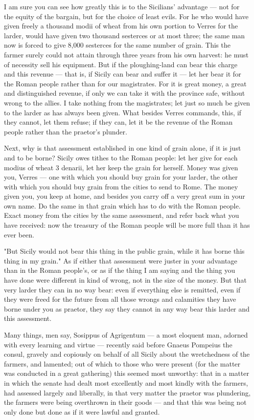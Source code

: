  I am sure you can see how greatly this is to the Sicilians' advantage --- not for the equity of the bargain, but for the choice of least evils. For he who would have given freely a thousand modii of wheat from his own portion to Verres for the larder, would have given two thousand sesterces or at most three; the same man now is forced to give 8,000 sesterces for the same number of grain. This the farmer surely could not attain through three years from his own harvest: he must of necessity sell his equipment. But if the ploughing-land can bear this charge and this revenue --- that is, if Sicily can bear and suffer it --- let her bear it for the Roman people rather than for our magistrates. For it is great money, a great and distinguished revenue, if only we can take it with the province safe, without wrong to the allies. I take nothing from the magistrates; let just so much be given to the larder as has always been given. What besides Verres commands, this, if they cannot, let them refuse; if they can, let it be the revenue of the Roman people rather than the praetor's plunder.

 Next, why is that assessment established in one kind of grain alone, if it is just and to be borne? Sicily owes tithes to the Roman people: let her give for each modius of wheat 3 denarii, let her keep the grain for herself. Money was given you, Verres --- one with which you should buy grain for your larder, the other with which you should buy grain from the cities to send to Rome. The money given you, you keep at home, and besides you carry off a very great sum in your own name. Do the same in that grain which has to do with the Roman people. Exact money from the cities by the same assessment, and refer back what you have received: now the treasury of the Roman people will be more full than it has ever been.

 "But Sicily would not bear this thing in the public grain, while it has borne this thing in my grain." As if either that assessment were juster in your advantage than in the Roman people's, or as if the thing I am saying and the thing you have done were different in kind of wrong, not in the size of the money. But that very larder they can in no way bear: even if everything else is remitted, even if they were freed for the future from all those wrongs and calamities they have borne under you as praetor, they say they cannot in any way bear this larder and this assessment.

 Many things, men say, Sosippus of Agrigentum --- a most eloquent man, adorned with every learning and virtue --- recently said before Gnaeus Pompeius the consul, gravely and copiously on behalf of all Sicily about the wretchedness of the farmers, and lamented; out of which to those who were present (for the matter was conducted in a great gathering) this seemed most unworthy: that in a matter in which the senate had dealt most excellently and most kindly with the farmers, had assessed largely and liberally, in that very matter the praetor was plundering, the farmers were being overthrown in their goods --- and that this was being not only done but done as if it were lawful and granted.

